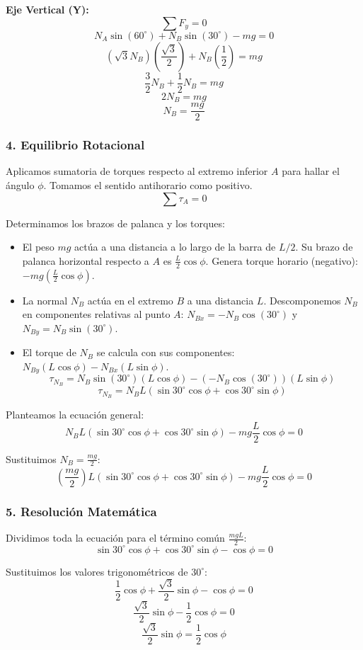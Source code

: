 \documentclass[12pt, a4paper]{article}
\begin{document}
\textbf{Eje Vertical (Y):}
$$\sum F_y = 0$$
$$N_A \sin(60^\circ) + N_B \sin(30^\circ) - mg = 0$$
$$\left( \sqrt{3} N_B \right) \left( \frac{\sqrt{3}}{2} \right) + N_B \left( \frac{1}{2} \right) = mg$$
$$\frac{3}{2} N_B + \frac{1}{2} N_B = mg$$
$$2 N_B = mg$$
$$N_B = \frac{mg}{2}$$

\subsubsection*{4. Equilibrio Rotacional}
Aplicamos sumatoria de torques respecto al extremo inferior $A$ para hallar el ángulo $\phi$. Tomamos el sentido antihorario como positivo.
$$\sum \tau_A = 0$$

Determinamos los brazos de palanca y los torques:
\begin{itemize}
    \item El peso $mg$ actúa a una distancia a lo largo de la barra de $L/2$. Su brazo de palanca horizontal respecto a $A$ es $\frac{L}{2} \cos\phi$. Genera torque horario (negativo): $-mg \left( \frac{L}{2} \cos\phi \right)$.
    \item La normal $N_B$ actúa en el extremo $B$ a una distancia $L$. Descomponemos $N_B$ en componentes relativas al punto $A$: $N_{Bx} = -N_B \cos(30^\circ)$ y $N_{By} = N_B \sin(30^\circ)$.
    \item El torque de $N_B$ se calcula con sus componentes: $N_{By} (L \cos\phi) - N_{Bx} (L \sin\phi)$. 
    $$ \tau_{N_B} = N_B \sin(30^\circ) (L \cos\phi) - (-N_B \cos(30^\circ)) (L \sin\phi) $$
    $$ \tau_{N_B} = N_B L \left( \sin 30^\circ \cos\phi + \cos 30^\circ \sin\phi \right) $$
\end{itemize}

Planteamos la ecuación general:
$$N_B L \left( \sin 30^\circ \cos\phi + \cos 30^\circ \sin\phi \right) - mg \frac{L}{2} \cos\phi = 0$$

Sustituimos $N_B = \frac{mg}{2}$:
$$\left( \frac{mg}{2} \right) L \left( \sin 30^\circ \cos\phi + \cos 30^\circ \sin\phi \right) - mg \frac{L}{2} \cos\phi = 0$$

\subsubsection*{5. Resolución Matemática}
Dividimos toda la ecuación para el término común $\frac{mgL}{2}$:
$$\sin 30^\circ \cos\phi + \cos 30^\circ \sin\phi - \cos\phi = 0$$

Sustituimos los valores trigonométricos de $30^\circ$:
$$\frac{1}{2} \cos\phi + \frac{\sqrt{3}}{2} \sin\phi - \cos\phi = 0$$
$$\frac{\sqrt{3}}{2} \sin\phi - \frac{1}{2} \cos\phi = 0$$
$$\frac{\sqrt{3}}{2} \sin\phi = \frac{1}{2} \cos\phi$$
\end{document}

